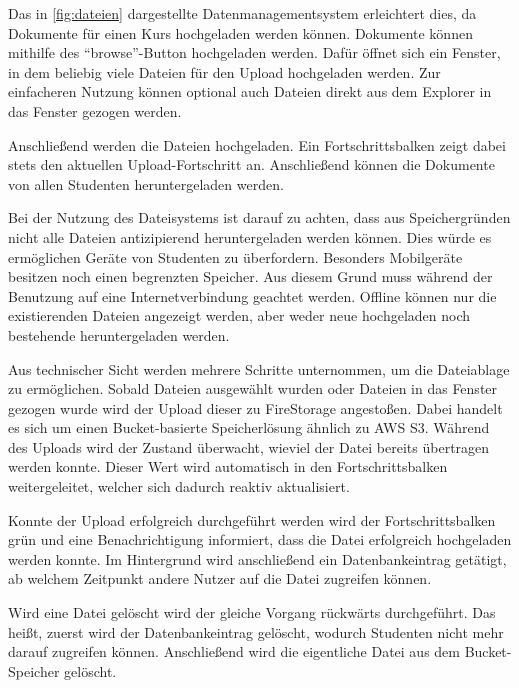 Das in \autoref{fig:dateien} dargestellte Datenmanagementsystem erleichtert dies, da Dokumente für einen Kurs hochgeladen werden können.
Dokumente können mithilfe des \enquote{browse}-Button hochgeladen werden.
Dafür öffnet sich ein Fenster, in dem beliebig viele Dateien für den Upload hochgeladen werden.
Zur einfacheren Nutzung können optional auch Dateien direkt aus dem Explorer in das Fenster gezogen werden.

Anschließend werden die Dateien hochgeladen.
Ein Fortschrittsbalken zeigt dabei stets den aktuellen Upload-Fortschritt an.
Anschließend können die Dokumente von allen Studenten heruntergeladen werden.

Bei der Nutzung des Dateisystems ist darauf zu achten, dass aus Speichergründen nicht alle Dateien antizipierend heruntergeladen werden können.
Dies würde es ermöglichen Geräte von Studenten zu überfordern.
Besonders Mobilgeräte besitzen noch einen begrenzten Speicher.
Aus diesem Grund muss während der Benutzung auf eine Internetverbindung geachtet werden.
Offline können nur die existierenden Dateien angezeigt werden, aber weder neue hochgeladen noch bestehende heruntergeladen werden.


Aus technischer Sicht werden mehrere Schritte unternommen, um die Dateiablage zu ermöglichen.
Sobald Dateien ausgewählt wurden oder Dateien in das Fenster gezogen wurde wird der Upload dieser zu FireStorage angestoßen.
Dabei handelt es sich um einen Bucket-basierte Speicherlösung ähnlich zu AWS S3.
Während des Uploads wird der Zustand überwacht, wieviel der Datei bereits übertragen werden konnte.
Dieser Wert wird automatisch in den Fortschrittsbalken weitergeleitet, welcher sich dadurch reaktiv aktualisiert.


Konnte der Upload erfolgreich durchgeführt werden wird der Fortschrittsbalken grün und eine Benachrichtigung informiert, dass die Datei erfolgreich hochgeladen werden konnte.
Im Hintergrund wird anschließend ein Datenbankeintrag getätigt, ab welchem Zeitpunkt andere Nutzer auf die Datei zugreifen können.

Wird eine Datei gelöscht wird der gleiche Vorgang rückwärts durchgeführt.
Das heißt, zuerst wird der Datenbankeintrag gelöscht, wodurch Studenten nicht mehr darauf zugreifen können.
Anschließend wird die eigentliche Datei aus dem Bucket-Speicher gelöscht.


